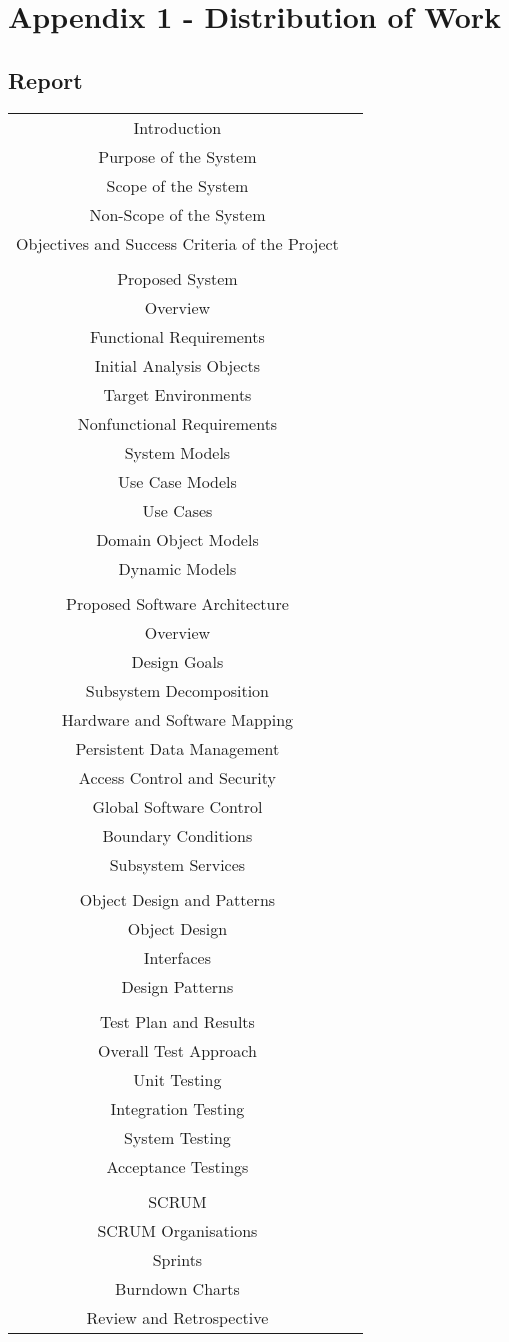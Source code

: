 \section{Appendix 1 - Distribution of Work}
\subsection{Report}
\begin{tabular}{*{2}{|c|}}
	Introduction &\\
	Purpose of the System & \\
	Scope of the System &\\
	Non-Scope of the System&\\
	Objectives and Success Criteria of the Project &\\
	\hline&\\
	\hline
	Proposed System&\\
	Overview&\\
	Functional Requirements&\\
	Initial Analysis Objects&\\
	Target Environments&\\
	Nonfunctional Requirements&\\
	\hline
	System Models&\\
	Use Case Models&\\
	Use Cases&\\
	Domain Object Models&\\
	Dynamic Models&\\
	\hline&\\
	\hline
	Proposed Software Architecture&\\
	Overview&\\
	Design Goals&\\
	Subsystem Decomposition&\\
	Hardware and Software Mapping&\\
	Persistent Data Management&\\
	Access Control and Security&\\
	Global Software Control&\\
	Boundary Conditions&\\
	\hline
	Subsystem Services&\\
	\hline&\\
	\hline
	Object Design and Patterns&\\
	Object Design&\\
	Interfaces&\\
	Design Patterns&\\
	\hline&\\
	\hline
	Test Plan and Results&\\
	Overall Test Approach&\\
	Unit Testing&\\
	Integration Testing&\\
	System Testing&\\
	Acceptance Testings&\\
	\hline&\\
	\hline
	SCRUM&\\
	SCRUM Organisations&\\
	Sprints&\\
	Burndown Charts&\\
	Review and Retrospective&\\
	\hline
\end{tabular}
